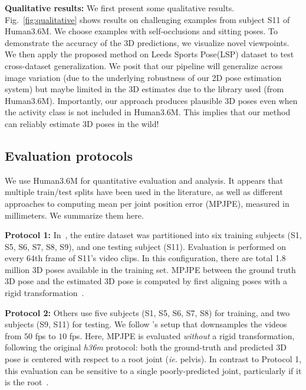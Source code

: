 \documentclass[10pt,twocolumn,letterpaper]{article}
\begin{document}
{\bf Qualitative results:} We first present
 some qualitative results. Fig.~\ref{fig:qualitative} shows results on challenging examples from subject S11 of Human3.6M. We choose examples with self-occlusions and sitting poses. To demonstrate the accuracy of the 3D predictions, we visualize novel viewpoints. We then apply the proposed method on Leeds Sports Pose(LSP) dataset \cite{Johnson10} to test cross-dataset generalization.
We posit that our pipeline will generalize across image variation (due to the underlying robustness of our 2D pose estimation system) but maybe limited in the 3D estimates due to the library used (from Human3.6M).
Importantly, our approach produces plausible 3D poses even when the activity class is not included in Human3.6M. This implies that our method can reliably estimate 3D poses in the wild!





\subsection{Evaluation protocols}
We use Human3.6M for quantitative evaluation and analysis. It appears that multiple train/test splits have been used in the literature, as well as different approaches to computing mean per joint position error (MPJPE), measured in millimeters. We summarize them here.

\textbf{Protocol 1:} In~\cite{Yasin_2016_CVPR,kostrikov2014depth,rogez2016mocap}, the entire dataset was partitioned into six training subjects (S1, S5, S6, S7, S8, S9), and one testing subject (S11). Evaluation is performed on every 64th frame of S11's video clips. In this configuration, there are total 1.8 million 3D poses available in the training set. MPJPE between the ground truth 3D pose and the estimated 3D pose is computed by first aligning poses with a rigid transformation~\cite{kostrikov2014depth}.

\textbf{Protocol 2:} Others \cite{Zhou_2016_CVPR,Tekin_2016_CVPR,li20143d} use five subjects (S1, S5, S6, S7, S8)  for training, and two subjects (S9, S11) for testing. We follow \cite{Zhou_2016_CVPR}'s setup that downsamples the videos from $50$ fps to $10$ fps.
Here, MPJPE is evaluated {\em without} a rigid transformation, following the original \textit{h36m} protocol: both the ground-truth and predicted 3D pose is centered with respect to a root joint (\textit{ie.} pelvis). In contrast to Protocol 1, this evaluation can be sensitive to a single poorly-predicted joint, particularly if it is the root~\cite{h36m_pami}.
\end{document}
